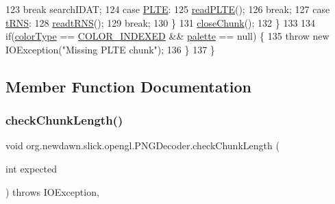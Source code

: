 \begin{DoxyCode}
123                 \textcolor{keywordflow}{break} searchIDAT;
124             \textcolor{keywordflow}{case} \mbox{\hyperlink{classorg_1_1newdawn_1_1slick_1_1opengl_1_1_p_n_g_decoder_ab0ffecb5ed3291a27538566f8f26aa6e}{PLTE}}:
125                 \mbox{\hyperlink{classorg_1_1newdawn_1_1slick_1_1opengl_1_1_p_n_g_decoder_ab43622729c487fd442e6cbd9fcd7e1ed}{readPLTE}}();
126                 \textcolor{keywordflow}{break};
127             \textcolor{keywordflow}{case} \mbox{\hyperlink{classorg_1_1newdawn_1_1slick_1_1opengl_1_1_p_n_g_decoder_a5f97fa38a4d7475be6a390f85ea1550d}{tRNS}}:
128                 \mbox{\hyperlink{classorg_1_1newdawn_1_1slick_1_1opengl_1_1_p_n_g_decoder_a4f69d28cdeb7cbd83b4b6dfef7662e48}{readtRNS}}();
129                 \textcolor{keywordflow}{break};
130             \}
131             \mbox{\hyperlink{classorg_1_1newdawn_1_1slick_1_1opengl_1_1_p_n_g_decoder_a8be80afb9e66943952de1e7d429303ac}{closeChunk}}();
132         \}
133 
134         \textcolor{keywordflow}{if}(\mbox{\hyperlink{classorg_1_1newdawn_1_1slick_1_1opengl_1_1_p_n_g_decoder_a01a4bfaf3046e4b6eb944e7d48eb31c3}{colorType}} == \mbox{\hyperlink{classorg_1_1newdawn_1_1slick_1_1opengl_1_1_p_n_g_decoder_a229a5a6a3ed73b28cbbe7d36bc78c4d1}{COLOR\_INDEXED}} && \mbox{\hyperlink{classorg_1_1newdawn_1_1slick_1_1opengl_1_1_p_n_g_decoder_ad65d46461f9f8df68a6b5551d56d8479}{palette}} == null) \{
135             \textcolor{keywordflow}{throw} \textcolor{keyword}{new} IOException(\textcolor{stringliteral}{"Missing PLTE chunk"});
136         \}
137     \}
\end{DoxyCode}


\subsection{Member Function Documentation}
\mbox{\label{classorg_1_1newdawn_1_1slick_1_1opengl_1_1_p_n_g_decoder_aef71cafb11cec0a888ba705be7211e48}} 
\subsubsection{\texorpdfstring{check\+Chunk\+Length()}{checkChunkLength()}}
{\footnotesize\ttfamily void org.\+newdawn.\+slick.\+opengl.\+P\+N\+G\+Decoder.\+check\+Chunk\+Length (\begin{DoxyParamCaption}\item[{int}]{expected }\end{DoxyParamCaption}) throws I\+O\+Exception\hspace{0.3cm}{\ttfamily [inline]}, {\ttfamily [private]}}


